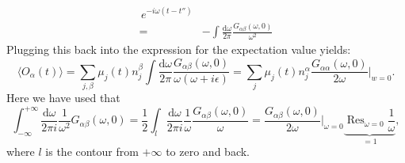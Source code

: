 \documentclass[master,       %
               twoside,        %
               BCOR10mm,       %
               english,ngerman, %
               ]{GAUBM}
\begin{document}
\begin{otherlanguage}{english}
\begin{align}
	\, e^{- i \omega (t - t'')}  \nonumber \\
	= & - \int \frac{\mathrm{d} \omega}{2 \pi} \frac{G_{\alpha \beta}(\omega, 0)} {\omega^2}
\end{align}
Plugging this back into the expression for the expectation value yields:
\begin{equation}
	\langle O_\alpha(t) \rangle = \sum_{j, \beta} \mu_j(t) n^\beta_j \int \frac{\mathrm{d} \omega}{2 \pi} \frac{G_{\alpha \beta}(\omega, 0)} { \omega (\omega + i \epsilon)} =  \sum_{j} \mu_j(t) n^\alpha_j \frac{G_{\alpha \alpha}(\omega, 0)}{2 \omega} \Big|_{w = 0}.
	\label{eq:chemical_potentials_linear_response}
\end{equation}
Here we have used that 
\begin{equation}
	\int_{-\infty}^{+\infty} \frac{\mathrm{d} \omega}{2\pi i} \frac{1}{\omega^2} G_{\alpha \beta}(\omega, 0) = \frac{1}{2} \int_l \frac{\mathrm{d} \omega}{2\pi i} \frac{1}{\omega} \frac{G_{\alpha \beta}(\omega, 0)}{\omega} = \frac{G_{\alpha \beta}(\omega, 0)}{2 \omega} \Big|_{\omega = 0} \underbrace{\operatorname{Res}_{\omega = 0} \frac{1}{\omega}}_{= 1},
\end{equation}
where $l$ is the contour from $+\infty$ to zero and back.


\end{otherlanguage}
\end{document}
